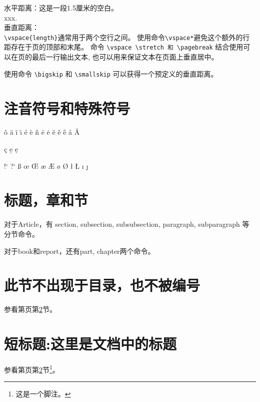 \documentclass[12pt, a4paper, onecolumn, notitlepage]{article}
\begin{document}
水平距离：这是\hspace{1.5cm}一段1.5厘米的空白。\\ %
xxx.\\ %

垂直距离：\\
\verb+\vspace{length}+通常用于两个空行之间。
使用命令\verb-\vspace*-避免这个额外的行距存在于页的顶部和末尾。
命令 \verb-\vspace \stretch 和 \pagebreak- 结合使用可以在页的最后一行输出文本,
也可以用来保证文本在页面上垂直居中。\\ \bigskip

使用命令 \verb-\bigskip- 和 \verb-\smallskip- 可以获得一个预定义的垂直距离。
\begin{comment}
\settoheight{lscommand}{text}
\settowidth{lscommand}{text}
\settodepth{lscommand}{text}
以上三个命令允许获得一个文本串的宽度、高度以及深度。如：\settowidth{\parindent}{This Paragraph:}
\end{comment}
\section{注音符号和特殊符号}
\^o \"a \"i \"\i{} \'e \`e \~n \=e \.e \u e \v e \H e \aa{} \AA{}

\c c \b e \d e

!` ?` \ss{} \oe{} \OE{} \ae{} \AE{} \o{} \O{} \l{} \L{} \i{} \j{}
\section{标题，章和节}
\label{jie:biaoti}
对于Article，有 section, subsection, subsubsection, paragraph, subparagraph 等分节命令。

对于book和report，还有part, chapter两个命令。
\section*{此节不出现于目录，也不被编号}
参看第\pageref{jie:biaoti}页第\ref{jie:biaoti}节。
\section[短标题的使用]{短标题:这里是文档中的标题}
参看第\pageref{jie:biaoti}页第\ref{jie:biaoti}节\footnote{这是一个脚注。}。
\end{document}
